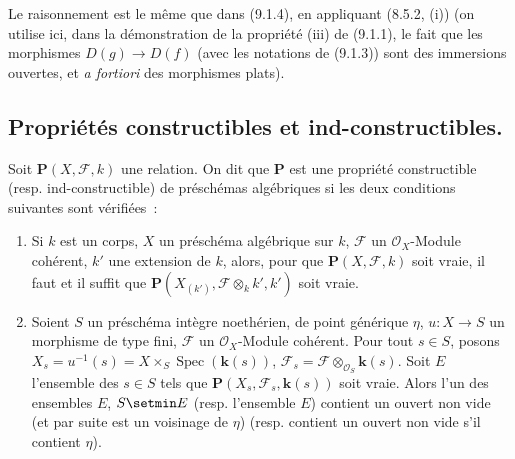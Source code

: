 Le raisonnement est le même que dans (9.1.4), en appliquant (8.5.2, (i))
(on utilise ici, dans la démonstration de la propriété (iii) de (9.1.1), le
fait que les morphismes $D(g)\to D(f)$ (avec les notations de (9.1.3)) sont
des immersions ouvertes, et \emph{a fortiori} des morphismes plats).

\subsection{Propriétés constructibles et ind-constructibles.}
\label{subsection:IV.9.2-fr}

\begin{definition}[9.2.1]
\label{IV.9.2.1-fr}
Soit $\boldsymbol{P}(X,\mathcal F,k)$ une relation. On dit que $\boldsymbol{P}$ est une
propriété constructible (\textup{resp.} ind-constructible) de préschémas
algébriques si les deux conditions suivantes sont vérifiées~:
\begin{enumerate}[label=\textup{(\roman*)}]
  \item Si $k$ est un corps, $X$ un préschéma algébrique sur $k$,
  $\mathcal F$ un $\mathcal O_X$-Module cohérent, $k'$ une extension de $k$,
  alors, pour que $\boldsymbol{P}(X,\mathcal F,k)$ soit vraie, il faut et il suffit
  que $\boldsymbol{P}(X_{(k')},\mathcal F\otimes_k k',k')$ soit vraie.
  \item Soient $S$ un préschéma intègre noethérien, de point générique $\eta$,
  $u:X\to S$ un morphisme de type fini, $\mathcal F$ un $\mathcal O_X$-Module
  cohérent. Pour tout $s\in S$, posons
  $X_s=u^{-1}(s)=X\times_S\operatorname{Spec}(\boldsymbol{k}(s))$,
  $\mathcal F_s=\mathcal F\otimes_{\mathcal O_S}\boldsymbol{k}(s)$. Soit $E$ l'ensemble
  des $s\in S$ tels que $\boldsymbol{P}(X_s,\mathcal F_s,\boldsymbol{k}(s))$ soit vraie.
  Alors l'un des ensembles $E$, $S\setmin E$ (\textup{resp.} l'ensemble $E$) contient un
  ouvert non vide \textup{(et par suite est un voisinage de $\eta$)} (\textup{resp.} contient
  un ouvert non vide s'il contient $\eta$).
\end{enumerate}
\end{definition}

